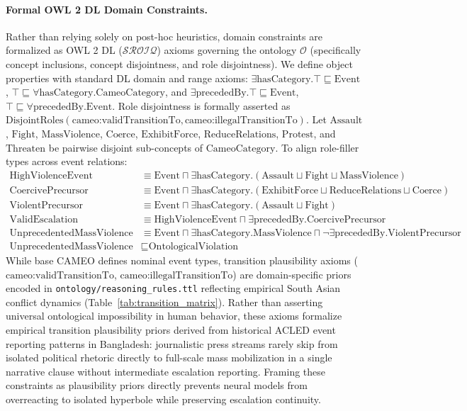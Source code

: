 \documentclass[11pt,a4paper]{article}
\begin{document}
\paragraph{Formal OWL 2 DL Domain Constraints.}
Rather than relying solely on post-hoc heuristics, domain constraints are formalized as
OWL 2 DL ($\mathcal{SROIQ}$) axioms governing the ontology $\mathcal{O}$ (specifically concept inclusions, concept disjointness, and role disjointness).
We define object properties with standard DL domain and range axioms:
$\exists \text{hasCategory}.\top \sqsubseteq \text{Event}$, $\top \sqsubseteq \forall \text{hasCategory}.\text{CameoCategory}$, and
$\exists \text{precededBy}.\top \sqsubseteq \text{Event}$, $\top \sqsubseteq \forall \text{precededBy}.\text{Event}$.
Role disjointness is formally asserted as $\text{DisjointRoles}(\text{cameo:validTransitionTo}, \text{cameo:illegalTransitionTo})$.
Let $\text{Assault}$, $\text{Fight}$, $\text{MassViolence}$, $\text{Coerce}$, $\text{ExhibitForce}$, $\text{ReduceRelations}$, $\text{Protest}$, and $\text{Threaten}$
be pairwise disjoint sub-concepts of $\text{CameoCategory}$. To align role-filler types across event relations:
\begin{align}
\text{HighViolenceEvent} &\equiv \text{Event} \sqcap \exists \text{hasCategory}.(\text{Assault} \sqcup \text{Fight} \sqcup \text{MassViolence}) \\
\text{CoercivePrecursor} &\equiv \text{Event} \sqcap \exists \text{hasCategory}.(\text{ExhibitForce} \sqcup \text{ReduceRelations} \sqcup \text{Coerce}) \\
\text{ViolentPrecursor} &\equiv \text{Event} \sqcap \exists \text{hasCategory}.(\text{Assault} \sqcup \text{Fight}) \\
\text{ValidEscalation} &\equiv \text{HighViolenceEvent} \sqcap \exists \text{precededBy}.\text{CoercivePrecursor} \\
\text{UnprecedentedMassViolence} &\equiv \text{Event} \sqcap \exists \text{hasCategory}.\text{MassViolence} \sqcap \neg \exists \text{precededBy}.\text{ViolentPrecursor} \\
\text{UnprecedentedMassViolence} &\sqsubseteq \text{OntologicalViolation}
\end{align}
While base CAMEO defines nominal event types, transition plausibility axioms ($\text{cameo:validTransitionTo}$, $\text{cameo:illegalTransitionTo}$) are domain-specific priors encoded in \texttt{ontology/reasoning\_rules.ttl} reflecting empirical South Asian conflict dynamics (Table~\ref{tab:transition_matrix}). Rather than asserting universal ontological impossibility in human behavior, these axioms formalize empirical transition plausibility priors derived from historical ACLED event reporting patterns in Bangladesh: journalistic press streams rarely skip from isolated political rhetoric directly to full-scale mass mobilization in a single narrative clause without intermediate escalation reporting. Framing these constraints as plausibility priors directly prevents neural models from overreacting to isolated hyperbole while preserving escalation continuity.
\end{document}
